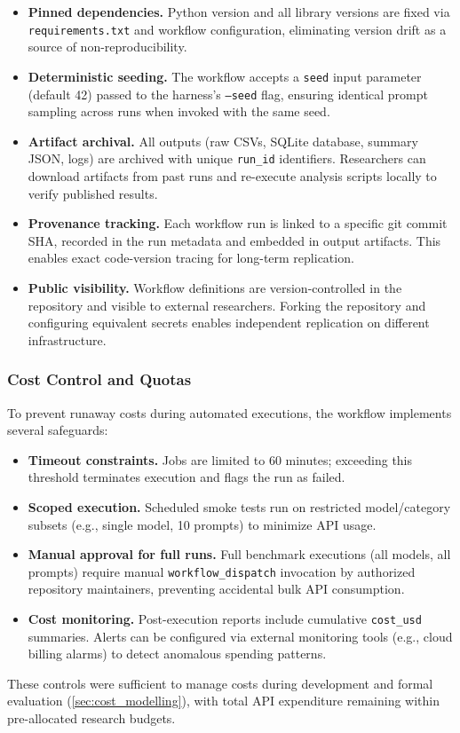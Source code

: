 \begin{itemize}
\item \textbf{Pinned dependencies.} Python version and all library versions are fixed via \texttt{requirements.txt} and workflow configuration, eliminating version drift as a source of non-reproducibility.
\item \textbf{Deterministic seeding.} The workflow accepts a \texttt{seed} input parameter (default 42) passed to the harness's \texttt{--seed} flag, ensuring identical prompt sampling across runs when invoked with the same seed.
\item \textbf{Artifact archival.} All outputs (raw CSVs, SQLite database, summary JSON, logs) are archived with unique \texttt{run\_id} identifiers. Researchers can download artifacts from past runs and re-execute analysis scripts locally to verify published results.
\item \textbf{Provenance tracking.} Each workflow run is linked to a specific git commit SHA, recorded in the run metadata and embedded in output artifacts. This enables exact code-version tracing for long-term replication.
\item \textbf{Public visibility.} Workflow definitions are version-controlled in the repository and visible to external researchers. Forking the repository and configuring equivalent secrets enables independent replication on different infrastructure.
\end{itemize}

\subsubsection{Cost Control and Quotas}

To prevent runaway costs during automated executions, the workflow implements several safeguards:

\begin{itemize}
\item \textbf{Timeout constraints.} Jobs are limited to 60 minutes; exceeding this threshold terminates execution and flags the run as failed.
\item \textbf{Scoped execution.} Scheduled smoke tests run on restricted model/category subsets (e.g., single model, 10 prompts) to minimize API usage.
\item \textbf{Manual approval for full runs.} Full benchmark executions (all models, all prompts) require manual \texttt{workflow\_dispatch} invocation by authorized repository maintainers, preventing accidental bulk API consumption.
\item \textbf{Cost monitoring.} Post-execution reports include cumulative \texttt{cost\_usd} summaries. Alerts can be configured via external monitoring tools (e.g., cloud billing alarms) to detect anomalous spending patterns.
\end{itemize}

These controls were sufficient to manage costs during development and formal evaluation (\cref{sec:cost_modelling}), with total API expenditure remaining within pre-allocated research budgets.

